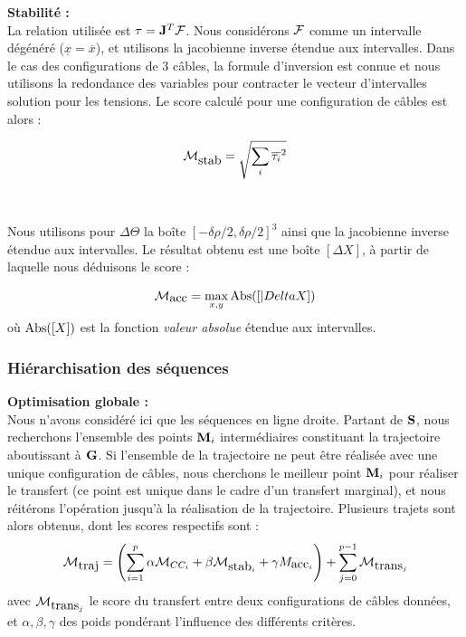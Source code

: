 {\bf Stabilit\'e :}\\

La relation utilis\'ee est ${\bf \tau} = {\bf J}^{T} {\boldmath \mathcal F}$. 
Nous consid\'erons ${\boldmath \mathcal F}$ comme un intervalle 
d\'eg\'en\'er\'e ($\underline{x} = \overline{x}$), et utilisons la jacobienne 
inverse \'etendue aux intervalles. Dans le cas des configurations de $3$ 
c\^ables, la formule d'inversion est connue et nous utilisons la redondance des 
variables pour contracter le vecteur d'intervalles solution pour les tensions. 
Le score calcul\'e pour une configuration de c\^ables est alors :

\begin{equation}
\mathcal M_{\hbox{stab}} = \sqrt{\sum_i \overline{\tau_i}^2}
\label{chap01:eq20}
\end{equation}\\

\\

Nous utilisons pour $\Delta \Theta$ la bo\^ite $[-\delta \rho/2, \delta 
\rho/2]^3$ ainsi que la jacobienne inverse \'etendue aux intervalles. Le 
r\'esultat obtenu est une bo\^ite $[\Delta X]$, \`a partir de laquelle nous 
d\'eduisons le score :

\begin{equation}
\mathcal M_{\hbox{acc}} = \max_{x,y}{\hbox{Abs}([|Delta X])}
\label{chap01:eq21}
\end{equation}
o\`u $\hbox{Abs}([X])$ est la fonction {\it valeur absolue} \'etendue aux 
intervalles.

\subsubsection{Hi\'erarchisation des s\'equences}

{\bf Optimisation globale :}\\

Nous n'avons consid\'er\'e ici que les s\'equences en ligne droite. Partant de 
${\bf S}$, nous recherchons l'ensemble des points ${\bf M}_i$ interm\'ediaires 
constituant la trajectoire aboutissant \`a $\bf G$. Si l'ensemble de la 
trajectoire ne peut \^etre r\'ealis\'ee avec une unique configuration de 
c\^ables, nous cherchons le meilleur point ${\bf M}_i$ pour r\'ealiser le 
transfert (ce point est unique dans le cadre d'un transfert marginal), et nous 
r\'eit\'erons l'op\'eration jusqu'\`a la r\'ealisation de la trajectoire. 
Plusieurs trajets sont alors obtenus, dont les scores respectifs sont :
\begin{equation}
\mathcal M_{\hbox{traj}} = \left (\sum_{i=1}^p \alpha \mathcal M_{CC_i} + \beta 
\mathcal M_{\hbox{stab}_i} + \gamma M_{\hbox{acc}_i} \right ) + \sum_{j = 
0}^{p-1} \mathcal M_{\hbox{trans}_j} 
\label{chap01:eq22}
\end{equation}
avec $\mathcal M_{\hbox{trans}_j}$ le score du transfert entre deux 
configurations de c\^ables donn\'ees, et $\alpha, \beta, \gamma$ des poids 
pond\'erant l'influence des diff\'erents crit\`eres.\\

